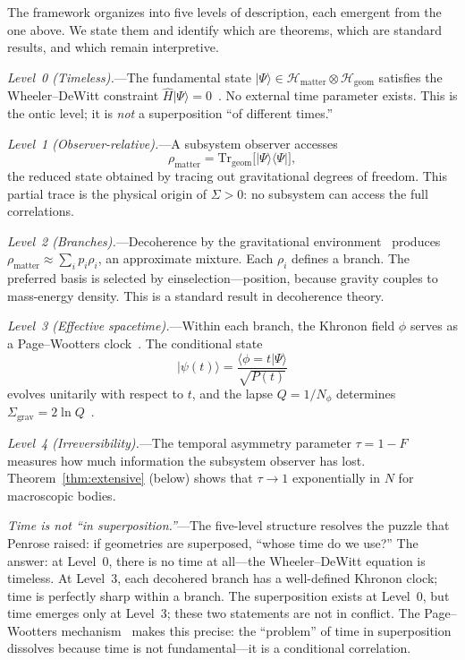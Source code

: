 \documentclass[prl,twocolumn,superscriptaddress,longbibliography,floatfix]{revtex4-2}
\newcommand{\Tr}{\mathrm{Tr}}
\newcommand{\hilb}{\mathcal{H}}
\newcommand{\ket}[1]{|#1\rangle}
\newcommand{\bra}[1]{\langle#1|}
\newcommand{\braket}[2]{\langle#1|#2\rangle}
\newcommand{\tauasym}{\tau}
\newcommand{\Sgrav}{\Sigma_{\mathrm{grav}}}
\begin{document}
The framework organizes into five levels of description, each
emergent from the one above.  We state them and identify which are
theorems, which are standard results, and which remain
interpretive.

\emph{Level~0 (Timeless).}---The fundamental state
$\ket{\Psi} \in \hilb_{\mathrm{matter}} \otimes
\hilb_{\mathrm{geom}}$ satisfies the Wheeler--DeWitt constraint
$\hat{H}\ket{\Psi} = 0$~\cite{DeWitt1967}.
No external time parameter exists.  This is the ontic
level; it is \emph{not} a superposition ``of different times.''

\emph{Level~1 (Observer-relative).}---A subsystem observer accesses
\begin{equation}
\rho_{\mathrm{matter}} = \Tr_{\mathrm{geom}}\!\big[\ket{\Psi}\bra{\Psi}\big],
\label{eq:rho_matter}
\end{equation}
the reduced state obtained by tracing out gravitational degrees of
freedom.  This partial trace is the physical origin of $\Sigma > 0$:
no subsystem can access the full correlations.

\emph{Level~2 (Branches).}---Decoherence by the gravitational
environment~\cite{Zurek2003,Pikovski2015} produces
$\rho_{\mathrm{matter}} \approx \sum_i p_i \rho_i$, an approximate
mixture.  Each $\rho_i$ defines a branch.  The preferred basis is
selected by einselection---position, because gravity couples to
mass-energy density.  This is a standard result in decoherence theory.

\emph{Level~3 (Effective spacetime).}---Within each branch, the
Khronon field $\phi$ serves as a Page--Wootters
clock~\cite{PageWootters1983}.  The conditional state
\begin{equation}
\ket{\psi(t)} = \frac{\braket{\phi=t}{\Psi}}{\sqrt{P(t)}}
\label{eq:PW}
\end{equation}
evolves unitarily with respect to $t$, and the lapse
$Q = 1/N_\phi$ determines $\Sgrav = 2\ln Q$~\cite{Paper2}.

\emph{Level~4 (Irreversibility).}---The temporal asymmetry parameter
$\tauasym = 1 - F$ measures how much information the subsystem
observer has lost.  Theorem~\ref{thm:extensive} (below) shows that
$\tauasym \to 1$ exponentially in $N$ for macroscopic bodies.

\emph{Time is not ``in superposition.''}---The five-level structure
resolves the puzzle that Penrose raised: if geometries are
superposed, ``whose time do we use?''  The answer: at Level~0,
there is no time at all---the Wheeler--DeWitt equation is timeless.
At Level~3, each decohered branch has a well-defined Khronon
clock; time is perfectly sharp within a branch.  The superposition
exists at Level~0, but time emerges only at Level~3; these two
statements are not in conflict.  The Page--Wootters
mechanism~\cite{PageWootters1983,Giovannetti2015} makes this
precise: the ``problem'' of time in superposition dissolves because
time is not fundamental---it is a conditional correlation.
\end{document}
